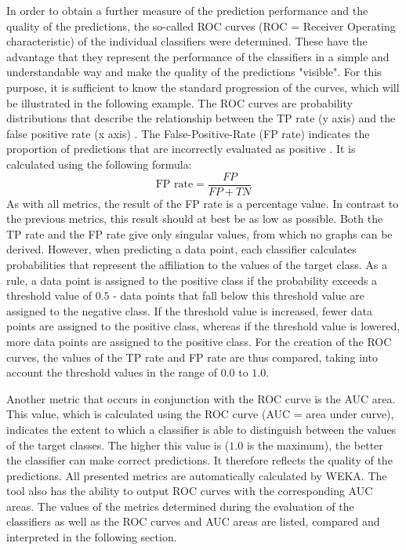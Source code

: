 In order to obtain a further measure of the prediction performance and the quality of the predictions, the so-called ROC curves (ROC = Receiver Operating characteristic) of the individual classifiers were determined. These have the advantage that they represent the performance of the classifiers in a simple and understandable way and make the quality of the predictions "visible". For this purpose, it is sufficient to know the standard progression of the curves, which will be illustrated in the following example.
The ROC curves are probability distributions that describe the relationship between the TP rate (y axis) and the false positive rate (x axis) \cite{Sammut2017}. The False-Positive-Rate (FP rate) indicates the proportion of predictions that are incorrectly evaluated as positive \cite{Alpaydin2010}. It is calculated using the following formula:
\\\[\text{FP rate} = \frac{FP}{FP+TN}\]
As with all metrics, the result of the FP rate is a percentage value. In contrast to the previous metrics, this result should at best be as low as possible. Both the TP rate and the FP rate give only singular values, from which no graphs can be derived. However, when predicting a data point, each classifier calculates probabilities that represent the affiliation to the values of the target class. As a rule, a data point is assigned to the positive class if the probability exceeds a threshold value of $0.5$ - data points that fall below this threshold value are assigned to the negative class. If the threshold value is increased, fewer data points are assigned to the positive class, whereas if the threshold value is lowered, more data points are assigned to the positive class. For the creation of the ROC curves, the values of the TP rate and FP rate are thus compared, taking into account the threshold values in the range of $0.0$ to $1.0$.

Another metric that occurs in conjunction with the ROC curve is the AUC area. This value, which is calculated using the ROC curve (AUC = area under curve), indicates the extent to which a classifier is able to distinguish between the values of the target classes. The higher this value is ($1.0$ is the maximum), the better the classifier can make correct predictions. It therefore reflects the quality of the predictions.
All presented metrics are automatically calculated by WEKA. The tool also has the ability to output ROC curves with the corresponding AUC areas. The values of the metrics determined during the evaluation of the classifiers as well as the ROC curves and AUC areas are listed, compared and interpreted in the following section.

